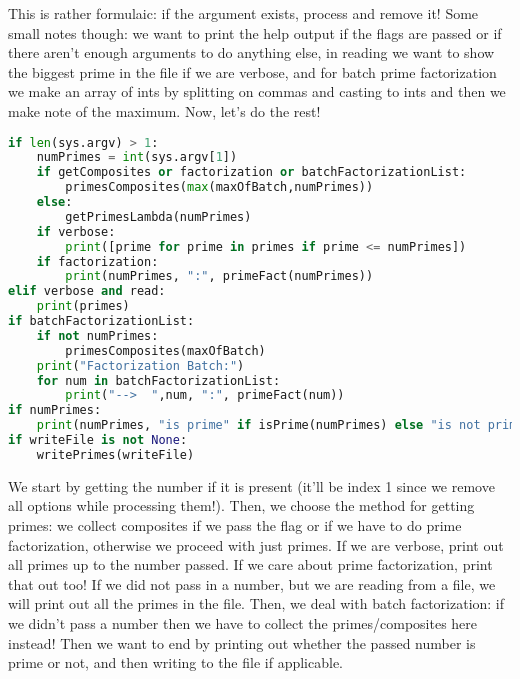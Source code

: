 \documentclass[11pt, twoside, reqno]{book}
\begin{document}
This is rather formulaic: if the argument exists, process and remove it! Some small notes though: we want to print the help output if the flags are passed or if there aren't enough arguments to do anything else, in reading we want to show the biggest prime in the file if we are verbose, and for batch prime factorization we make an array of ints by splitting on commas and casting to ints and then we make note of the maximum. Now, let's do the rest!
\begin{lstlisting}[language=Python]
if len(sys.argv) > 1:
    numPrimes = int(sys.argv[1])
    if getComposites or factorization or batchFactorizationList:
        primesComposites(max(maxOfBatch,numPrimes))
    else:
        getPrimesLambda(numPrimes)
    if verbose:
        print([prime for prime in primes if prime <= numPrimes])
    if factorization:
        print(numPrimes, ":", primeFact(numPrimes))
elif verbose and read:
    print(primes)
if batchFactorizationList:
    if not numPrimes:
        primesComposites(maxOfBatch)
    print("Factorization Batch:")
    for num in batchFactorizationList:
        print("-->  ",num, ":", primeFact(num))
if numPrimes:
    print(numPrimes, "is prime" if isPrime(numPrimes) else "is not prime")
if writeFile is not None:
    writePrimes(writeFile)
\end{lstlisting}

We start by getting the number if it is present (it'll be index 1 since we remove all options while processing them!). Then, we choose the method for getting primes: we collect composites if we pass the flag or if we have to do prime factorization, otherwise we proceed with just primes. If we are verbose, print out all primes up to the number passed. If we care about prime factorization, print that out too! If we did not pass in a number, but we are reading from a file, we will print out all the primes in the file. Then, we deal with batch factorization: if we didn't pass a number then we have to collect the primes/composites here instead! Then we want to end by printing out whether the passed number is prime or not, and then writing to the file if applicable.
\end{document}
